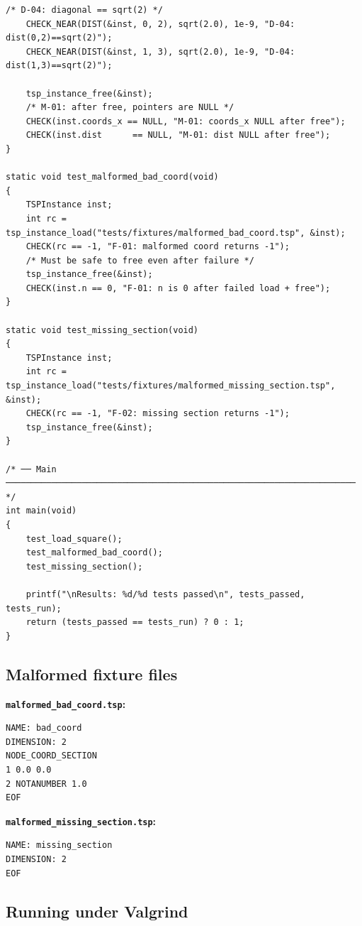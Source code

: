\begin{lstlisting}[style=cstyle]
    /* D-04: diagonal == sqrt(2) */
    CHECK_NEAR(DIST(&inst, 0, 2), sqrt(2.0), 1e-9, "D-04: dist(0,2)==sqrt(2)");
    CHECK_NEAR(DIST(&inst, 1, 3), sqrt(2.0), 1e-9, "D-04: dist(1,3)==sqrt(2)");

    tsp_instance_free(&inst);
    /* M-01: after free, pointers are NULL */
    CHECK(inst.coords_x == NULL, "M-01: coords_x NULL after free");
    CHECK(inst.dist      == NULL, "M-01: dist NULL after free");
}

static void test_malformed_bad_coord(void)
{
    TSPInstance inst;
    int rc = tsp_instance_load("tests/fixtures/malformed_bad_coord.tsp", &inst);
    CHECK(rc == -1, "F-01: malformed coord returns -1");
    /* Must be safe to free even after failure */
    tsp_instance_free(&inst);
    CHECK(inst.n == 0, "F-01: n is 0 after failed load + free");
}

static void test_missing_section(void)
{
    TSPInstance inst;
    int rc = tsp_instance_load("tests/fixtures/malformed_missing_section.tsp", &inst);
    CHECK(rc == -1, "F-02: missing section returns -1");
    tsp_instance_free(&inst);
}

/* ── Main ───────────────────────────────────────────────────────────────────── */
int main(void)
{
    test_load_square();
    test_malformed_bad_coord();
    test_missing_section();

    printf("\nResults: %d/%d tests passed\n", tests_passed, tests_run);
    return (tests_passed == tests_run) ? 0 : 1;
}
\end{lstlisting}

\subsection{Malformed fixture files}

\textbf{\texttt{malformed\_bad\_coord.tsp}:}
\begin{lstlisting}[style=cstyle, language={}, numbers=none]
NAME: bad_coord
DIMENSION: 2
NODE_COORD_SECTION
1 0.0 0.0
2 NOTANUMBER 1.0
EOF
\end{lstlisting}

\textbf{\texttt{malformed\_missing\_section.tsp}:}
\begin{lstlisting}[style=cstyle, language={}, numbers=none]
NAME: missing_section
DIMENSION: 2
EOF
\end{lstlisting}

\subsection{Running under Valgrind}

